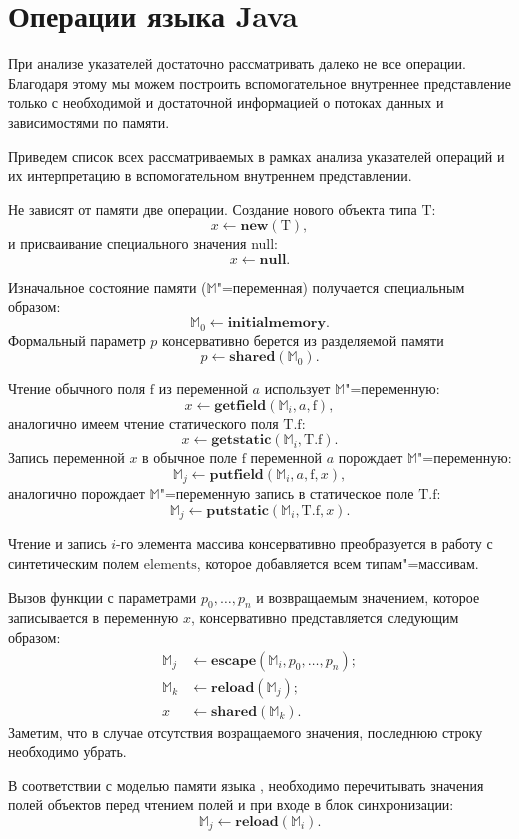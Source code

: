 \documentclass[14pt,titlepage,draft]{extarticle}
\newcommand{\java}{\eng{Java}\xspace}
\newcommand{\M}{\ensuremath{\mathbb{M}}}
\newcommand{\type}[1]{\mathrm{#1}}
\newcommand{\field}[1]{\mathrm{#1}}
\newcommand{\sfield}[2]{\type{#1}.\field{#2}}
\newcommand{\op}[1]{\mathbf{#1}}
\begin{document}
  \section{Операции языка Java}

    При анализе указателей достаточно рассматривать далеко не все операции.
    Благодаря этому мы можем построить вспомогательное внутреннее представление
    только с необходимой и достаточной информацией о потоках данных и
    зависимостями по памяти.

    Приведем список всех рассматриваемых в рамках анализа указателей операций и
    их интерпретацию в вспомогательном внутреннем представлении.

    Не зависят от памяти две операции. Создание нового объекта типа $\type{T}$:
    \[ x \gets \op{new}(\type{T}), \]
    и присваивание специального значения null:
    \[ x \gets \op{null}. \]

    Изначальное состояние памяти (\M"=переменная) получается специальным
    образом:
    \[ \M_0 \gets \op{initialmemory}. \]
    Формальный параметр $p$ консервативно берется из разделяемой памяти
    \[ p \gets \op{shared}(\M_0). \]

    Чтение обычного поля $\field{f}$ из переменной $a$ использует
    \M"=переменную:
    \[ x \gets \op{getfield}(\M_i, a, \field{f}), \]
    аналогично имеем чтение статического поля $\sfield{T}{f}$:
    \[ x \gets \op{getstatic}(\M_i, \sfield{T}{f}). \]
    Запись переменной $x$ в обычное поле $\field{f}$ переменной $a$ порождает
    \M"=переменную:
    \[ \M_j \gets \op{putfield}(\M_i, a, \field{f}, x), \]
    аналогично порождает \M"=переменную запись в статическое поле
    $\sfield{T}{f}$:
    \[ \M_j \gets \op{putstatic}(\M_i, \sfield{T}{f}, x). \]

    Чтение и запись $i$-го элемента массива консервативно преобразуется в
    работу с синтетическим полем $\field{elements}$, которое добавляется всем
    типам"=массивам.

    Вызов функции с параметрами $p_0, \ldots, p_n$ и возвращаемым значением,
    которое записывается в переменную $x$, консервативно представляется
    следующим образом:
    \[\begin{aligned}
      \M_j &\gets \op{escape}(\M_i, p_0, \ldots, p_n); \\
      \M_k &\gets \op{reload}(\M_j); \\
      x  &\gets \op{shared}(\M_k).
    \end{aligned}\]
    Заметим, что в случае отсутствия возращаемого значения, последнюю строку
    необходимо убрать.

    В соответствии с моделью памяти языка \java, необходимо перечитывать
    значения полей объектов перед чтением  полей и при входе в
    блок синхронизации:
    \[ \M_j \gets \op{reload}(\M_i). \]


  \newpage
  
\end{document}
